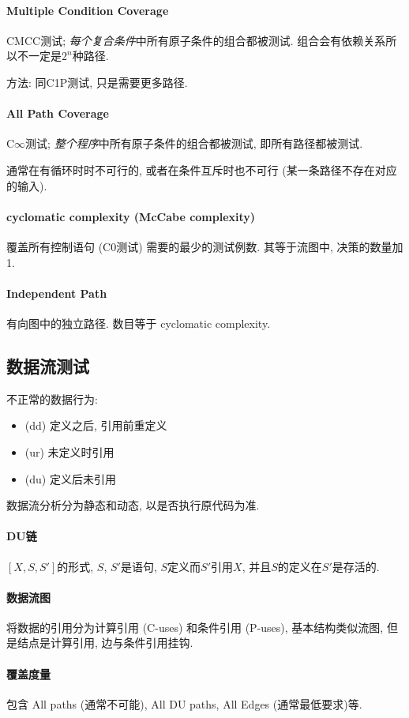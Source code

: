 \documentclass{ctexart}
\begin{document}
\paragraph{Multiple Condition Coverage}
    CMCC测试; \emph{每个复合条件}中所有原子条件的组合都被测试. 组合会有依赖关系所以不一定是$2^n$种路径.\par
    方法: 同C1P测试, 只是需要更多路径.
\paragraph{All Path Coverage}
    C$\infty$测试; \emph{整个程序}中所有原子条件的组合都被测试, 即所有路径都被测试.\par
    通常在有循环时时不可行的, 或者在条件互斥时也不可行 (某一条路径不存在对应的输入).
\paragraph{cyclomatic complexity (McCabe complexity)}
    覆盖所有控制语句 (C0测试) 需要的最少的测试例数. 其等于流图中, 决策的数量加1.
\paragraph{Independent Path}
    有向图中的独立路径. 数目等于 cyclomatic complexity.

\subsection{数据流测试}
    不正常的数据行为: \begin{itemize}
        \item (dd) 定义之后, 引用前重定义
        \item (ur) 未定义时引用
        \item (du) 定义后未引用
    \end{itemize}
    数据流分析分为静态和动态, 以是否执行原代码为准.
\paragraph{DU链} $[X, S, S']$的形式, $S$, $S'$是语句,
    $S$定义而$S'$引用$X$, 并且$S$的定义在$S'$是存活的.
\paragraph{数据流图} 将数据的引用分为计算引用 (C-uses) 和条件引用 (P-uses),
    基本结构类似流图, 但是结点是计算引用, 边与条件引用挂钩.
\paragraph{覆盖度量} 包含 All paths (通常不可能),
    All DU paths, All Edges (通常最低要求)等.
\end{document}
